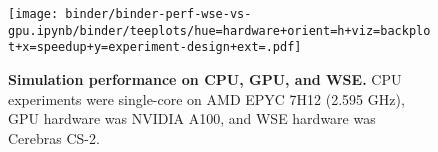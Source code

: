 \begin{figure}

\centering
\texttt{[image: binder/binder-perf-wse-vs-gpu.ipynb/binder/teeplots/hue=hardware+orient=h+viz=backplot+x=speedup+y=experiment-design+ext=.pdf]}

\vspace{-2ex}
\vspace{-2ex}

\caption{
  \textbf{Simulation performance on CPU, GPU, and WSE.}
  \footnotesize
  CPU experiments were single-core on AMD EPYC 7H12 (2.595 GHz), GPU hardware was NVIDIA A100, and WSE hardware was Cerebras CS-2.
}
\label{fig:perf}

\vspace{-3ex}

\end{figure}
